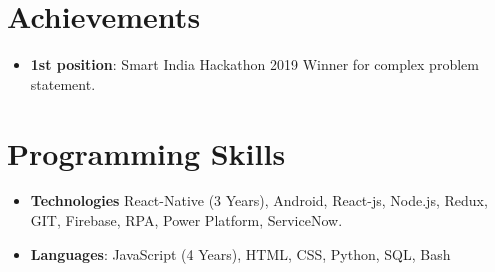 \documentclass[letterpaper,11pt]{article}
\newcommand{\resumeItem}[2]{\item\small{\textbf{#1}{: #2 \vspace{-2pt}}}}
\newcommand{\resumeSubItem}[2]{\item\small{\textbf{#1}{#2 \vspace{-2pt}}}}
\newcommand{\resumeSubHeadingListStart}{\begin{itemize}[leftmargin=*]}
\newcommand{\resumeSubHeadingListEnd}{\end{itemize}}
\begin{document}
\section{Achievements}
\resumeSubHeadingListStart
  \resumeItem{1st position}
{Smart India Hackathon 2019 Winner for complex problem statement.}

  \resumeSubHeadingListEnd


\section{Programming Skills}
\resumeSubHeadingListStart
\resumeSubItem{Technologies}{ React-Native (3 Years), Android, React-js, Node.js, Redux, GIT, Firebase, RPA, Power Platform, ServiceNow.}
\resumeSubItem{Languages}{: JavaScript (4 Years), HTML, CSS, Python, SQL, Bash}

\resumeSubHeadingListEnd


\end{document}
